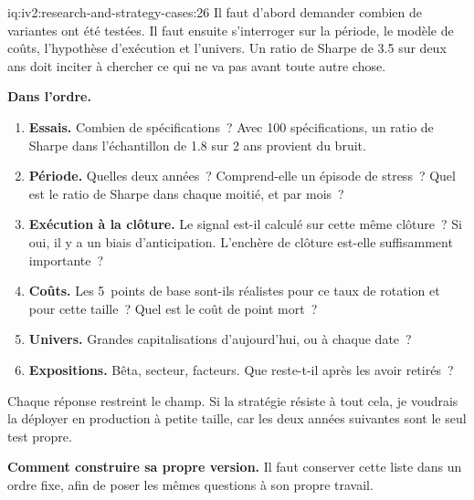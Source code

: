 \begin{solution}{iq:iv2:research-and-strategy-cases:26}
Il faut d'abord demander combien de variantes ont été testées. Il faut ensuite s'interroger sur la période, le modèle de coûts, l'hypothèse d'exécution et l'univers. Un ratio de Sharpe de 3.5 sur deux ans doit inciter à chercher ce qui ne va pas avant toute autre chose.

\textbf{Dans l'ordre.}
\begin{enumerate}
\item \textbf{Essais.} Combien de spécifications~? Avec 100 spécifications, un ratio de Sharpe dans l'échantillon de 1.8 sur 2 ans provient du bruit.
\item \textbf{Période.} Quelles deux années~? Comprend-elle un épisode de stress~? Quel est le ratio de Sharpe dans chaque moitié, et par mois~?
\item \textbf{Exécution à la clôture.} Le signal est-il calculé sur cette même clôture~? Si oui, il y a un biais d'anticipation. L'enchère de clôture est-elle suffisamment importante~?
\item \textbf{Coûts.} Les 5~points de base sont-ils réalistes pour ce taux de rotation et pour cette taille~? Quel est le coût de point mort~?
\item \textbf{Univers.} Grandes capitalisations d'aujourd'hui, ou à chaque date~?
\item \textbf{Expositions.} Bêta, secteur, facteurs. Que reste-t-il après les avoir retirés~?
\end{enumerate}

Chaque réponse restreint le champ. Si la stratégie résiste à tout cela, je voudrais la déployer en production à petite taille, car les deux années suivantes sont le seul test propre.

\textbf{Comment construire sa propre version.} Il faut conserver cette liste dans un ordre fixe, afin de poser les mêmes questions à son propre travail.

\end{solution}

